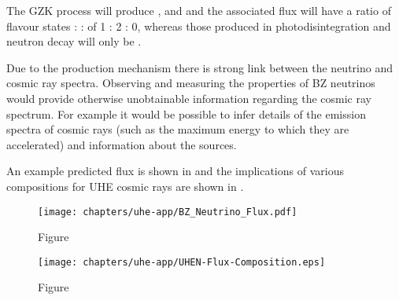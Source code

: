 \noindent The GZK process will produce \Pnue, \Pnum and \APnum and the associated flux will have a ratio of flavour states \Pnue : \Pnum : \Pnut of 1 : 2 : 0, whereas those produced in photodisintegration and neutron decay will only be \APnue.

Due to the production mechanism there is strong link between the neutrino and cosmic ray spectra. Observing and measuring the properties of BZ neutrinos would provide otherwise unobtainable information regarding the cosmic ray spectrum. For example it would be possible to infer details of the emission spectra of cosmic rays (such as the maximum energy to which they are accelerated) and information about the sources.

An example predicted flux is shown in  and the implications of various compositions for UHE cosmic rays are shown in . 

\begin{figure}[htpb]
  \centering
  \texttt{[image: chapters/uhe-app/BZ\_Neutrino\_Flux.pdf]}
  \caption{Figure}
  \label{fig:uhe-app:UHEN:UHEN-Flux}
\end{figure}

\begin{figure}[htpb]
  \centering
  \texttt{[image: chapters/uhe-app/UHEN-Flux-Composition.eps]}
  \caption{Figure}
  \label{fig:uhe-app:UHEN:UHEN-Flux-Composition-Models}
\end{figure}




%
%
%
%
%
